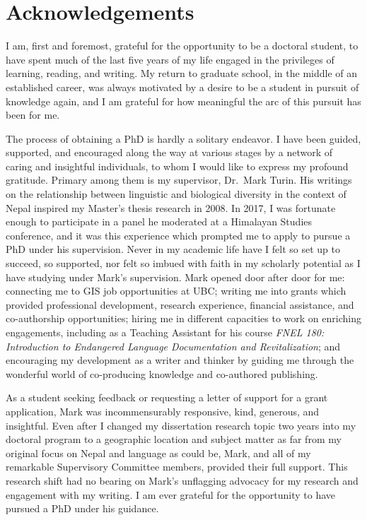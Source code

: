 \documentclass[
]{article}
\begin{document}
\clearpage

\section*{Acknowledgements}

I am, first and foremost, grateful for the opportunity to be a doctoral student, to have spent much of the last five years of my life engaged in the privileges of learning, reading, and writing. My return to graduate school, in the middle of an established career, was always motivated by a desire to be a student in pursuit of knowledge again, and I am grateful for how meaningful the arc of this pursuit has been for me.

The process of obtaining a PhD is hardly a solitary endeavor. I have been guided, supported, and encouraged along the way at various stages by a network of caring and insightful individuals, to whom I would like to express my profound gratitude. Primary among them is my supervisor, Dr.~Mark Turin. His writings on the relationship between linguistic and biological diversity in the context of Nepal inspired my Master's thesis research in 2008. In 2017, I was fortunate enough to participate in a panel he moderated at a Himalayan Studies conference, and it was this experience which prompted me to apply to pursue a PhD under his supervision. Never in my academic life have I felt so set up to succeed, so supported, nor felt so imbued with faith in my scholarly potential as I have studying under Mark's supervision. Mark opened door after door for me: connecting me to GIS job opportunities at UBC; writing me into grants which provided professional development, research experience, financial assistance, and co-authorship opportunities; hiring me in different capacities to work on enriching engagements, including as a Teaching Assistant for his course \emph{FNEL 180: Introduction to Endangered Language Documentation and Revitalization}; and encouraging my development as a writer and thinker by guiding me through the wonderful world of co-producing knowledge and co-authored publishing.

As a student seeking feedback or requesting a letter of support for a grant application, Mark was incommensurably responsive, kind, generous, and insightful. Even after I changed my dissertation research topic two years into my doctoral program to a geographic location and subject matter as far from my original focus on Nepal and language as could be, Mark, and all of my remarkable Supervisory Committee members, provided their full support. This research shift had no bearing on Mark's unflagging advocacy for my research and engagement with my writing. I am ever grateful for the opportunity to have pursued a PhD under his guidance.
\end{document}
